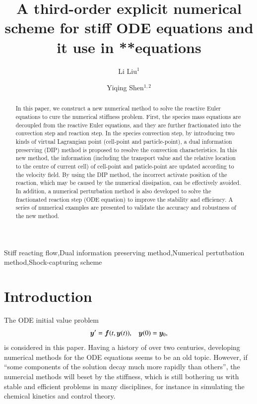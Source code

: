 \documentclass[review]{elsarticle}
\theoremstyle{plain}\newtheorem{definition}{\sc{Definition}}
\theoremstyle{defination}\newtheorem{example}{Example}[section]
\numberwithin{equation}{section}
\numberwithin{table}{section}
\begin{document}
\title{A third-order explicit numerical scheme for stiff ODE equations and it use in **equations }
\author{Li Liu$^1$}
\author{Yiqing Shen$^{1,2}$ }
\address{$^1$LHD, Institute of Mechanics, Chinese Academy of Sciences, Beijing 100190, China}
\address{$^2$School of Engineering Science, University of Chinese Academy of Sciences, Beijing 100049, China}
{
\begin{abstract}
In this paper, we construct a new numerical method to solve the reactive Euler equations to cure the numerical stiffness problem.
First, the species mass equations are decoupled from the reactive Euler equations, and they are further fractionated into the convection step and reaction step.
 In the species convection
step, by introducing two kinds of virtual Lagrangian point (cell-point and particle-point), a dual information preserving (DIP) method is proposed to resolve the convection characteristics. In this new method, the 
 information (including the transport value and the relative location to the centre of current cell) of cell-point and paticle-point are updated according to the velocity field. By using the DIP method, the incorrect activate position of the reaction, which may be caused by the numerical dissipation, can be effectively avoided. In addition, a numerical perturbation method is also developed to solve the fractionated reaction step (ODE equation) to improve the stability and efficiency. A series of numerical examples are presented to validate the accuracy and robustness of the new method. 
\end{abstract}
\begin{keyword}
 Stiff reacting flow\sep  Dual information preserving method\sep Numerical pertutbation method\sep Shock-capturing scheme 
\end{keyword}

\maketitle
\section{Introduction}

The ODE initial value problem
\begin{equation}\label{eq:ode}
  \bm{y}'= \bm{f}(t,\bm{y}(t)), \hspace{0.3cm} \bm{y}(0)= \bm{y}_0,
  \end{equation}
  is considered in this paper. 
  Having a history of over two centuries, developing numerical methods for the ODE equations seems to be an old topic.  However, if ``some components of the solution decay much more rapidly than others''\cite{lambert1991numerical}, the numercial methods will beset by the stiffness, which is still bothering us with stable and efficient problems in many disciplines, for instance in simulating the  chemical kinetics and control theory.

}
\end{document}
